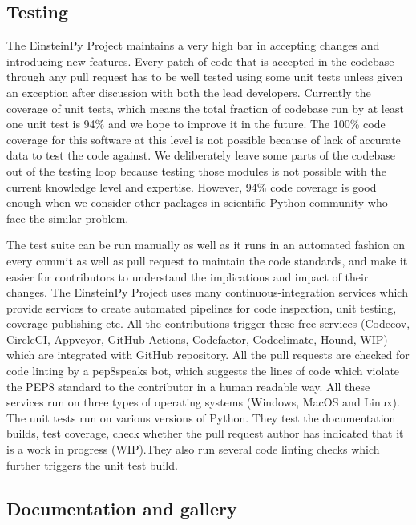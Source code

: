 \documentclass{aastex63}
\begin{document}
\subsection{ Testing} \label{subsec: Testing}
The EinsteinPy Project maintains a very high bar in accepting changes and introducing new features. Every patch of code that is accepted in the codebase through any pull request has to be well tested using some unit tests unless given an exception after discussion with both the lead developers. Currently the coverage of unit tests, which means the total fraction of codebase run by at least one unit test is 94\% and we hope to improve it in the future. The 100\% code coverage for this software at this level is not possible because of lack of accurate data to test the code against. We deliberately leave some parts of the codebase out of the testing loop because testing those modules is not possible with the current knowledge level and expertise. However, 94\% code coverage is good enough when we consider other packages in scientific Python community who face the similar problem.  

The test suite can be run manually as well as it runs in an automated fashion on every commit as well as pull request to maintain the code standards, and make it easier for contributors to understand the implications and impact of their changes. The EinsteinPy Project uses many continuous-integration services which provide services to create automated pipelines for code inspection, unit testing, coverage publishing etc. All the contributions trigger these free services (Codecov, CircleCI, Appveyor, GitHub Actions, Codefactor, Codeclimate, Hound, WIP) which are integrated with GitHub repository. All the pull requests are checked for code linting by a pep8speaks bot, which suggests the lines of code which violate the PEP8 standard to the contributor in a human readable way. All these services run on three types of operating systems (Windows, MacOS and Linux). The unit tests run on various versions of Python. They test the documentation builds, test coverage, check whether the pull request author has indicated that it is a work in progress (WIP).They also run several code linting checks which further triggers the unit test build.

\subsection{ Documentation and gallery} \label{subsec:  Documentation and gallery}
\end{document}

